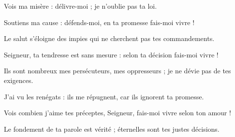 \item Vois ma misère : délivre-moi ; je n'oublie pas ta loi.

\item Soutiens ma cause : défends-moi, en ta promesse fais-moi vivre !

\item Le salut s'éloigne des impies qui ne cherchent pas tes commandements.

\item Seigneur, ta tendresse est sans mesure : selon ta décision fais-moi vivre !

\item Ils sont nombreux mes persécuteurs, mes oppresseurs ; je ne dévie pas de tes exigences.

\item J'ai vu les renégats : ils me répugnent, car ils ignorent ta promesse.

\item Vois combien j'aime tes préceptes, Seigneur, fais-moi vivre selon ton amour !

\item Le fondement de ta parole est vérité ; éternelles sont tes justes décisions.
